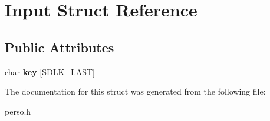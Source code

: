 \hypertarget{structInput}{}\section{Input Struct Reference}
\label{structInput}
\subsection*{Public Attributes}
\begin{DoxyCompactItemize}
\item 
char {\bfseries key} \mbox{[}S\+D\+L\+K\+\_\+\+L\+A\+ST\mbox{]}\hypertarget{structInput_a211bceabbcc2ccdd710502d596692ab5}{}\label{structInput_a211bceabbcc2ccdd710502d596692ab5}

\end{DoxyCompactItemize}


The documentation for this struct was generated from the following file\+:\begin{DoxyCompactItemize}
\item 
perso.\+h\end{DoxyCompactItemize}
